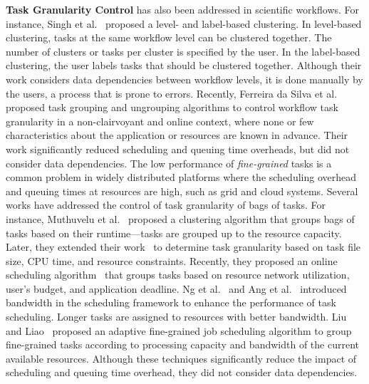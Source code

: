 \textbf{Task Granularity Control} has also been addressed in scientific workflows. For instance, Singh et al.~\cite{Singh2008} proposed a level- and label-based clustering. In level-based clustering, tasks at the same workflow level can be clustered together. The number of clusters or tasks per cluster is specified by the user. In the label-based clustering, the user labels tasks that should be clustered together. Although their work considers data dependencies between workflow levels, it is done manually by the users, a process that is prone to errors. Recently, Ferreira da Silva et al.~\cite{Ferreira-granularity-2013} proposed task grouping and ungrouping algorithms to control workflow task granularity in a non-clairvoyant and online context, where none or few characteristics about the application or resources are known in advance. Their work significantly reduced scheduling and queuing time overheads, but did not consider data dependencies. The low performance of \emph{fine-grained} tasks is a common problem in widely distributed platforms where the scheduling overhead and queuing times at resources are high, such as grid and cloud systems. Several works have addressed the control of task granularity of bags of tasks. For instance, Muthuvelu et al.~\cite{Muthuvelu2005} proposed a clustering algorithm that groups bags of tasks based on their runtime---tasks are grouped up to the resource capacity. Later, they extended their work~\cite{4493929} to determine task granularity based on task file size, CPU time, and resource constraints. Recently, they proposed an online scheduling algorithm~\cite{Muthuvelu2010,Muthuvelu2013} that groups tasks based on resource network utilization, user's budget, and application deadline. Ng et al.~\cite{Keat2006} and Ang et al.~\cite{Ang2009} introduced bandwidth in the scheduling framework to enhance the performance of task scheduling. Longer tasks are assigned to resources with better bandwidth. Liu and Liao~\cite{Liu2009} proposed an adaptive fine-grained job scheduling algorithm to group fine-grained tasks according to processing capacity and bandwidth of the current available resources. Although these techniques significantly reduce the impact of scheduling and queuing time overhead, they did not consider data dependencies.


